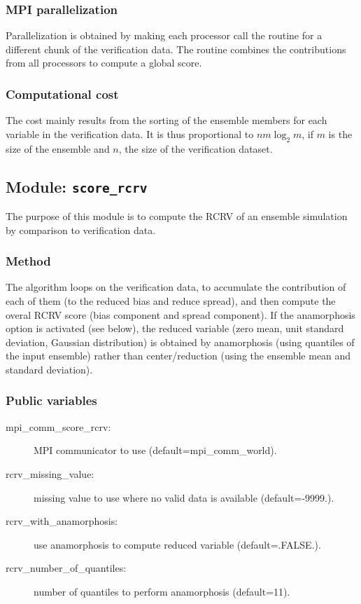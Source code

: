 \documentclass[11pt]{article}
\begin{document}
\subsubsection*{MPI parallelization}

Parallelization is obtained by making each processor call the routine
for a different chunk of the verification data.
The routine combines the contributions from all processors
to compute a global score.

\subsubsection*{Computational cost}

The cost mainly results from the sorting of the ensemble members
for each variable in the verification data.
It is thus proportional to $n m \log_2 m$,
if $m$ is the size of the ensemble and $n$, the size of the verification dataset.

\subsection{Module: {\tt\bf score\_rcrv}}

The purpose of this module is to compute the RCRV
of an ensemble simulation by comparison to verification data.

\subsubsection*{Method}

The algorithm loops on the verification data,
to accumulate the contribution of each of them
(to the reduced bias and reduce spread),
and then compute the overal RCRV score
(bias component and spread component).
If the anamorphosis option is activated (see below),
the reduced variable (zero mean, unit standard deviation, Gaussian distribution)
is obtained by anamorphosis (using quantiles of the input ensemble)
rather than center/reduction (using the ensemble mean and standard deviation).

\subsubsection*{Public variables}

\begin{description}
\item[mpi\_comm\_score\_rcrv:] MPI communicator to use (default=mpi\_comm\_world).
\item[rcrv\_missing\_value:] missing value to use where no valid data is available (default=-9999.).
\item[rcrv\_with\_anamorphosis:] use anamorphosis to compute reduced variable (default=.FALSE.).
\item[rcrv\_number\_of\_quantiles:] number of quantiles to perform anamorphosis (default=11).
\end{description}
\end{document}
